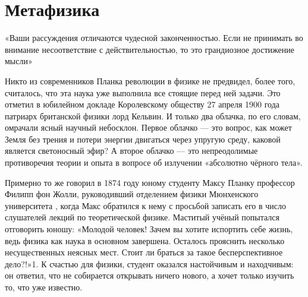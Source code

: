 \chapter{Метафизика}
\label {metaphysics}

«Ваши рассуждения отличаются чудесной законченностью. Если не принимать во внимание несоответствие с действительностью, то это грандиозное достижение мысли» \cite{arnold-cm-r}


Никто из современников Планка революции в физике не предвидел, более того, считалось, что эта наука уже выполнила все стоящие перед ней задачи. Это отметил в юбилейном докладе Королевскому обществу 27 апреля 1900 года патриарх британской физики лорд Кельвин. И только два облачка, по его словам, омрачали ясный научный небосклон. Первое облачко — это вопрос, как может Земля без трения и потери энергии двигаться через упругую среду, каковой является светоносный эфир? А второе облачко — это непреодолимые противоречия теории и опыта в вопросе об излучении «абсолютно чёрного тела».

Примерно то же говорил в 1874 году юному студенту Максу Планку профессор Филипп фон Жолли, руководивший отделением физики Мюнхенского университета \cite{maslov-r}, когда Макс обратился к нему с просьбой записать его в число слушателей лекций по теоретической физике. Маститый учёный попытался отговорить юношу: «Молодой человек! Зачем вы хотите испортить себе жизнь, ведь физика как наука в основном завершена. Осталось прояснить несколько несущественных неясных мест. Стоит ли браться за такое бесперспективное дело?!»1. К счастью для физики, студент оказался настойчивым и находчивым: он ответил, что не собирается открывать ничего нового, а хочет только изучить то, что уже известно.


